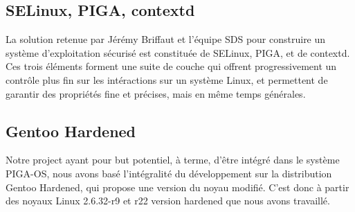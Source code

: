 
\subsection{SELinux, PIGA, contextd}

La solution retenue par Jérémy Briffaut et l'équipe SDS pour construire un système d'exploitation sécurisé est constituée de SELinux, PIGA, et de contextd. Ces trois éléments forment une suite de couche qui offrent progressivement un contrôle plus fin sur les intéractions sur un système Linux, et permettent de garantir des propriétés fine et précises, mais en même temps générales.

\subsection{Gentoo Hardened}

Notre project ayant pour but potentiel, à terme, d'être intégré dans le système PIGA-OS, nous avons basé l'intégralité du développement sur la distribution Gentoo Hardened, qui propose une version du noyau modifié. C'est donc à partir des noyaux Linux 2.6.32-r9 et r22 version hardened que nous avons travaillé.
